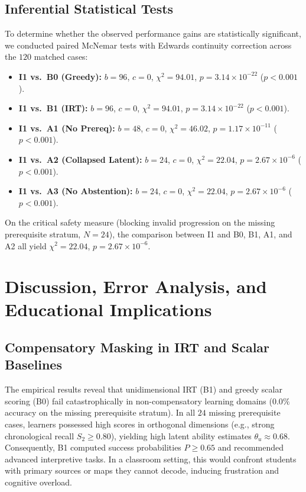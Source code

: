 \documentclass[11pt,a4paper]{article}
\begin{document}
\subsection{Inferential Statistical Tests}

To determine whether the observed performance gains are statistically significant, we conducted paired McNemar tests with Edwards continuity correction across the $120$ matched cases:
\begin{itemize}[leftmargin=1.5em]
    \item \textbf{I1 vs.\ B0 (Greedy):} $b = 96$, $c = 0$, $\chi^2 = 94.01$, $p = 3.14 \times 10^{-22}$ ($p < 0.001$).
    \item \textbf{I1 vs.\ B1 (IRT):} $b = 96$, $c = 0$, $\chi^2 = 94.01$, $p = 3.14 \times 10^{-22}$ ($p < 0.001$).
    \item \textbf{I1 vs.\ A1 (No Prereq):} $b = 48$, $c = 0$, $\chi^2 = 46.02$, $p = 1.17 \times 10^{-11}$ ($p < 0.001$).
    \item \textbf{I1 vs.\ A2 (Collapsed Latent):} $b = 24$, $c = 0$, $\chi^2 = 22.04$, $p = 2.67 \times 10^{-6}$ ($p < 0.001$).
    \item \textbf{I1 vs.\ A3 (No Abstention):} $b = 24$, $c = 0$, $\chi^2 = 22.04$, $p = 2.67 \times 10^{-6}$ ($p < 0.001$).
\end{itemize}

On the critical safety measure (blocking invalid progression on the missing prerequisite stratum, $N=24$), the comparison between I1 and B0, B1, A1, and A2 all yield $\chi^2 = 22.04$, $p = 2.67 \times 10^{-6}$.

\section{Discussion, Error Analysis, and Educational Implications}

\subsection{Compensatory Masking in IRT and Scalar Baselines}
The empirical results reveal that unidimensional IRT (B1) and greedy scalar scoring (B0) fail catastrophically in non-compensatory learning domains ($0.0\%$ accuracy on the missing prerequisite stratum). In all $24$ missing prerequisite cases, learners possessed high scores in orthogonal dimensions (e.g., strong chronological recall $S_2 \ge 0.80$), yielding high latent ability estimates $\theta_u \approx 0.68$. Consequently, B1 computed success probabilities $P \ge 0.65$ and recommended advanced interpretive tasks. In a classroom setting, this would confront students with primary sources or maps they cannot decode, inducing frustration and cognitive overload.
\end{document}
